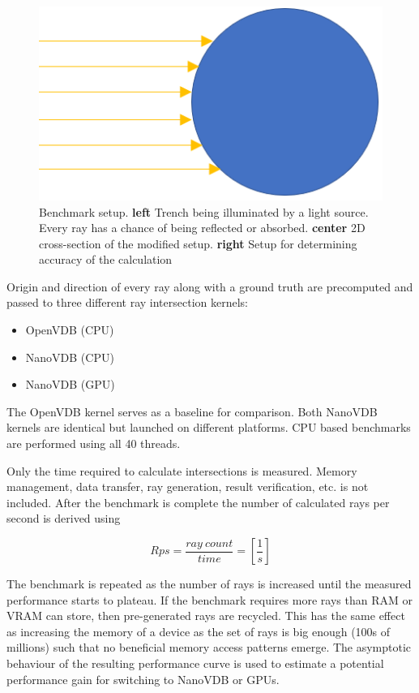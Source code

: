 \begin{figure}[!htb]
	\endminipage\hfill
	\includegraphics[width=\linewidth]{res/rays_on_sphere.png}
	\endminipage

	\caption{Benchmark setup.
		\textbf{left} Trench being illuminated by a light source. Every ray has a chance of being reflected or absorbed.
		\textbf{center} 2D cross-section of the modified setup.
		\textbf{right} Setup for determining accuracy of the calculation
	}
	\label{fig:benchmark_setup}
\end{figure}


Origin and direction of every ray along with a ground truth are precomputed and passed to three different ray intersection kernels:

\begin{itemize}
	\item OpenVDB (CPU)
	\item NanoVDB (CPU)
	\item NanoVDB (GPU)
\end{itemize}

The OpenVDB kernel serves as a baseline for comparison.
Both NanoVDB kernels are identical but launched on different platforms.
CPU based benchmarks are performed using all 40 threads.

Only the time required to calculate intersections is measured. Memory management, data transfer, ray generation, result verification, etc. is not included.
After the benchmark is complete the number of calculated rays per second is derived using

\begin{equation}
	Rps = \frac{ray \: count}{time} = [\frac{1}{s}]
\end{equation}

The benchmark is repeated as the number of rays is increased until the measured performance starts to plateau.
If the benchmark requires more rays than RAM or VRAM can store, then pre-generated rays are recycled.
This has the same effect as increasing the memory of a device as the set of rays is big enough (100s of millions) such that no beneficial memory access patterns emerge.
The asymptotic behaviour of the resulting performance curve is used to estimate a potential performance gain for switching to NanoVDB or GPUs.

